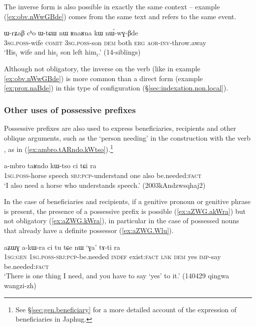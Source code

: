 The inverse form  is also possible in exactly the same context -- example  (\ref{ex:obv.nWwGBde}) comes from the same text and refers to the same event. 

\begin{exe}
\ex \label{ex:obv.nWwGBde}
\gll ɯ-rʑaβ cʰo ɯ-tɕɯ nɯ ʁnaʁna kɯ nɯ́-wɣ-βde\\
\textsc{3sg}.\textsc{poss}-wife \textsc{comit} \textsc{3sg}.\textsc{poss}-son \textsc{dem} both \textsc{erg} \textsc{aor}-\textsc{inv}-throw.away\\
\glt `His$_i$ wife and his$_i$ son left him$_i$.' (14-siblings)
\end{exe}

Although not obligatory, the inverse on the verb (like in example \ref{ex:obv.nWwGBde}) is more common than a direct form (example \ref{ex:prox.naBde}) in this type of configuration (§\ref{sec:indexation.non.local}).

\subsubsection{Other uses of possessive prefixes} \label{sec:other.uses.poss.prefixes}
Possessive prefixes are also used to express beneficiaries, recipients and other oblique arguments, such as the `person needing' in the construction with the verb ,  as in (\ref{ex:ambro.tARndo.kWtso}).\footnote{See §\ref{sec:gen.beneficiary} for a more detailed account of the expression of beneficiaries in Japhug.}

 \begin{exe}
\ex \label{ex:ambro.tARndo.kWtso}
\gll a-mbro taʁndo kɯ-tso ci tɕi ra \\
\textsc{1sg}.\textsc{poss}-horse speech \textsc{sbj}:\textsc{pcp}-understand one also be.needed:\textsc{fact} \\
\glt `I also need a horse who understands speech.' (2003kAndzwsqhaj2)
\end{exe}

In the case of beneficiaries and recipients, if a genitive pronoun or genitive phrase is present, the presence of a possessive prefix is possible (\ref{ex:aZWG.akWra}) but not obligatory (\ref{ex:aZWG.kWra}), in particular in the case of possessed nouns that already have a definite possessor (\ref{ex:aZWG.Wlu}).

 \begin{exe}
\ex \label{ex:aZWG.akWra}
\gll aʑɯɣ a-kɯ-ra ci tu tɕe nɯ `ɣa' tɤ-ti ra \\
\textsc{1sg}:\textsc{gen} \textsc{1sg}.\textsc{poss}-\textsc{sbj}:\textsc{pcp}-be.needed \textsc{indef} exist:\textsc{fact} \textsc{lnk} \textsc{dem} yes \textsc{imp}-say be.needed:\textsc{fact} \\
\glt `There is one thing I need, and you have to say `yes' to it.' (140429 qingwa wangzi-zh)
\end{exe}


